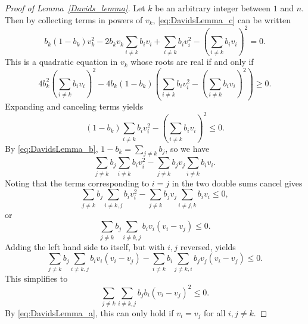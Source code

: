 \begin{proof}[Proof of Lemma~\ref{Davids_lemma}]
    Let \( k \) be an arbitrary integer between \( 1 \) and \( n \). Then by collecting terms in powers of \( v_k \),
\eqref{eq:DavidsLemma_c} can be written
\begin{equation*}
  b_{k}(1-b_{k})v_{k}^{2} - 2b_{k}v_{k}\sum_{i \neq k}b_{i}v_{i} + \sum_{i \neq k}b_{i}v_{i}^{2} - \left(\sum_{i \neq k}b_{i}v_{i}\right)^{2} = 0.
\end{equation*}
This is a quadratic equation in \( v_{k} \) whose roots are real if and only if
\begin{equation*}
    4b_{k}^{2}\left(\sum_{i \neq k}b_{i}v_{i}\right)^{2} - 4b_{k}(1-b_{k})\left(\sum_{i \neq k}b_{i}v_{i}^{2} - \left(\sum_{i \neq k}b_{i}v_{i}\right)^{2}\right) \geq 0.
\end{equation*}
Expanding and canceling terms yields
\begin{equation*}
    (1-b_{k})\sum_{i \neq k}b_{i}v_{i}^{2} - \left(\sum_{i \neq k}b_{i}v_{i} \right)^{2} \leq 0.
\end{equation*}
By \eqref{eq:DavidsLemma_b}, \( 1-b_{k} = \sum_{j \ne k}b_{j} \), so we have
\begin{equation*}
    \sum_{j \neq k}b_{j}\sum_{i \neq k}b_{i}v_{i}^{2} - \sum_{j \neq k}b_{j}v_{j}\sum_{i \neq k}b_{i}v_{i}.
\end{equation*}
Noting that the terms corresponding to \( i = j \) in the two double sums cancel gives
\begin{equation*}
    \sum_{j \neq k}b_{j}\sum_{i \neq k,j}b_{i}v_{i}^{2} - \sum_{j \neq k}b_{j}v_{j}\sum_{i \neq j,k}b_{i}v_{i} \leq 0,
\end{equation*}
or
\begin{equation*}
    \sum_{j \neq k}b_{j}\sum_{i \neq k,j}b_{i}v_{i}(v_{i} - v_{j}) \leq 0.
\end{equation*}
Adding the left hand side to itself, but with \( i,j \) reversed, yields
\begin{equation*}
    \sum_{j \neq k}b_{j}\sum_{i \neq k,j}b_{i}v_{i}(v_{i} - v_{j}) - \sum_{i \neq k}b_{i}\sum_{j \neq k,i}b_{j}v_{j}(v_{i} - v_{j}) \leq 0.
\end{equation*}
This simplifies to
\begin{equation*}
    \sum_{j \neq k}\sum_{i \neq k,j}b_{j}b_{i}(v_{i} - v_{j})^{2} \leq 0.
\end{equation*}
By \eqref{eq:DavidsLemma_a}, this can only hold if \( v_{i} = v_{j} \) for all \( i,j \neq k \).
\end{proof}

